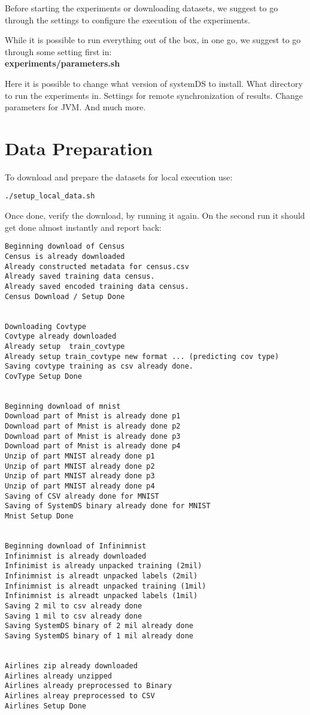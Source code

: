 \documentclass{readme}
\begin{document}
Before starting the experiments or downloading datasets,
we suggest to go through the settings to configure the execution of the experiments.

While it is possible to run everything out of the box, in one go,
we suggest to go through some setting first in: \\
\textbf{experiments/parameters.sh}

Here it is possible to change what version of systemDS to install.
What directory to run the experiments in.
Settings for remote synchronization of results.
Change parameters for JVM.
And much more.


\section{Data Preparation}

To download and prepare the datasets for local execution use:


\begin{lstlisting}
./setup_local_data.sh
\end{lstlisting}

Once done, verify the download, by running it again.
On the second run it should get done almost instantly and report back:


\begin{lstlisting}
Beginning download of Census
Census is already downloaded
Already constructed metadata for census.csv
Already saved training data census.
Already saved encoded training data census.
Census Download / Setup Done


Downloading Covtype
Covtype already downloaded
Already setup  train_covtype
Already setup train_covtype new format ... (predicting cov type)
Saving covtype training as csv already done.
CovType Setup Done


Beginning download of mnist
Download part of Mnist is already done p1
Download part of Mnist is already done p2
Download part of Mnist is already done p3
Download part of Mnist is already done p4
Unzip of part MNIST already done p1
Unzip of part MNIST already done p2
Unzip of part MNIST already done p3
Unzip of part MNIST already done p4
Saving of CSV already done for MNIST
Saving of SystemDS binary already done for MNIST
Mnist Setup Done


Beginning download of Infinimnist
Infinimnist is already downloaded
Infinimist is already unpacked training (2mil)
Infinimnist is alreadt unpacked labels (2mil)
Infinimnist is alreadt unpacked training (1mil)
Infinimnist is alreadt unpacked labels (1mil)
Saving 2 mil to csv already done
Saving 1 mil to csv already done
Saving SystemDS binary of 2 mil already done
Saving SystemDS binary of 1 mil already done


Airlines zip already downloaded
Airlines already unzipped
Airlines already preprocessed to Binary
Airlines alreay preprocessed to CSV
Airlines Setup Done
\end{lstlisting}
\end{document}
